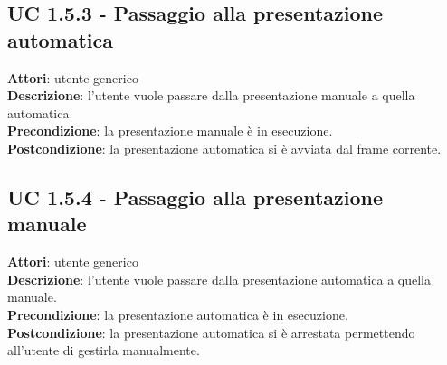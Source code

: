 	\subsection{UC 1.5.3 - Passaggio alla presentazione automatica}{
		\label{uc1.5.3}
		\textbf{Attori}: utente generico \\
		\textbf{Descrizione}: l'utente vuole passare dalla presentazione manuale a quella automatica. \\
		\textbf{Precondizione}: la presentazione manuale è in esecuzione.	\\
		\textbf{Postcondizione}: la presentazione automatica si è avviata dal frame corrente.	\\
	}
	\subsection{UC 1.5.4 - Passaggio alla presentazione manuale}{
		\label{uc1.5.4}
		\textbf{Attori}: utente generico \\
		\textbf{Descrizione}: l'utente vuole passare dalla presentazione automatica a quella manuale. \\
		\textbf{Precondizione}: la presentazione automatica è in esecuzione.	\\
		\textbf{Postcondizione}: la presentazione automatica si è arrestata permettendo all'utente di gestirla manualmente.	\\
	}